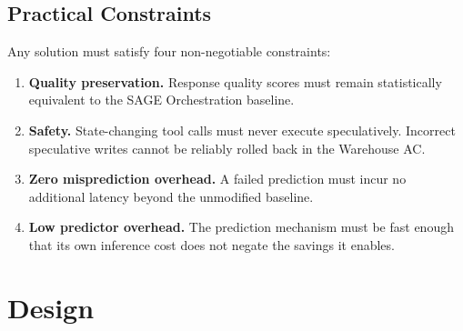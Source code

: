 \documentclass[conference]{IEEEtran}
\begin{document}
\subsection{Practical Constraints}
Any solution must satisfy four non-negotiable constraints:
\begin{enumerate}[itemsep=3pt]
  \item \textbf{Quality preservation.} Response quality scores must remain
        statistically equivalent to the SAGE Orchestration baseline.
  \item \textbf{Safety.} State-changing tool calls must never execute
        speculatively. Incorrect speculative writes cannot be reliably rolled
        back in the Warehouse AC.
  \item \textbf{Zero misprediction overhead.} A failed prediction must incur no
        additional latency beyond the unmodified baseline.
  \item \textbf{Low predictor overhead.} The prediction mechanism must be fast
        enough that its own inference cost does not negate the savings it enables.
\end{enumerate}

\section{Design}
\end{document}
